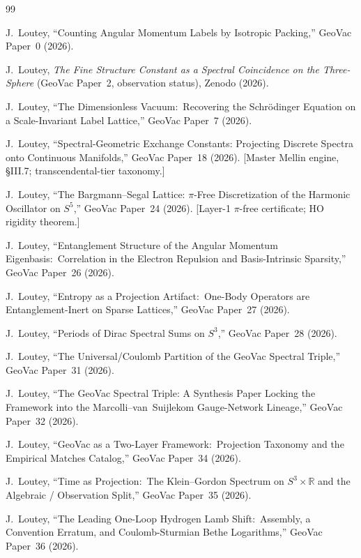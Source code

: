 \documentclass[aps,pra,twocolumn,superscriptaddress,longbibliography,nofootinbib]{revtex4-2}
\begin{document}
\begin{thebibliography}{99}

J.~Loutey,
``Counting Angular Momentum Labels by Isotropic Packing,''
GeoVac Paper~0 (2026).

J.~Loutey, \emph{The Fine Structure Constant as a Spectral
Coincidence on the Three-Sphere} (GeoVac Paper~2, observation status), Zenodo
(2026).

J.~Loutey,
``The Dimensionless Vacuum:\ Recovering the Schr\"odinger Equation on
a Scale-Invariant Label Lattice,''
GeoVac Paper~7 (2026).

J.~Loutey,
``Spectral-Geometric Exchange Constants: Projecting Discrete Spectra
onto Continuous Manifolds,''
GeoVac Paper~18 (2026).
[Master Mellin engine, \S III.7; transcendental-tier taxonomy.]

J.~Loutey,
``The Bargmann--Segal Lattice: $\pi$-Free Discretization of the Harmonic
Oscillator on $S^5$,''
GeoVac Paper~24 (2026).
[Layer-1 $\pi$-free certificate; HO rigidity theorem.]

J.~Loutey,
``Entanglement Structure of the Angular Momentum Eigenbasis:\
Correlation in the Electron Repulsion and Basis-Intrinsic Sparsity,''
GeoVac Paper~26 (2026).

J.~Loutey,
``Entropy as a Projection Artifact:\ One-Body Operators are
Entanglement-Inert on Sparse Lattices,''
GeoVac Paper~27 (2026).

J.~Loutey,
``Periods of Dirac Spectral Sums on $S^3$,''
GeoVac Paper~28 (2026).

J.~Loutey,
``The Universal/Coulomb Partition of the GeoVac Spectral Triple,''
GeoVac Paper~31 (2026).

J.~Loutey,
``The GeoVac Spectral Triple: A Synthesis Paper Locking the Framework
into the Marcolli--van~Suijlekom Gauge-Network Lineage,''
GeoVac Paper~32 (2026).

J.~Loutey,
``GeoVac as a Two-Layer Framework:\ Projection Taxonomy and the Empirical
Matches Catalog,''
GeoVac Paper~34 (2026).

J.~Loutey,
``Time as Projection:\ The Klein--Gordon Spectrum on
$S^3\times\mathbb{R}$ and the Algebraic / Observation Split,''
GeoVac Paper~35 (2026).

J.~Loutey,
``The Leading One-Loop Hydrogen Lamb Shift:\ Assembly, a Convention
Erratum, and Coulomb-Sturmian Bethe Logarithms,''
GeoVac Paper~36 (2026).

\end{thebibliography}
\end{document}
